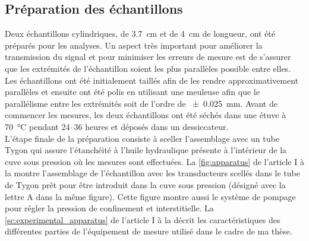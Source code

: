 \subsection{Préparation des échantillons}
Deux échantillons cylindriques, de \SI{3.7}{\cm} et de \SI{4}{\cm} de longueur,
ont été préparés pour les analyses. Un aspect très important pour améliorer la
transmission du signal et pour minimiser les erreurs de mesure est de s'assurer
que les extrémités de l'échantillon soient les plus parallèles possible entre
elles. Les échantillons ont été initialement taillés afin de les rendre
approximativement parallèles et ensuite ont été polis en utilisant une meuleuse
afin que le parallélisme entre les extrémités soit de l'ordre de
\SI{\pm0.025}{\mm}. Avant de commencer les mesures, les deux échantillons ont
été séchés dans une étuve à \SI{70}{\degreeCelsius} pendant \numrange{24}{36}
heures et déposés dans un dessiccateur.\\
L'étape finale de la préparation consiste à sceller l'assemblage avec un tube
Tygon\texttrademark{} qui assure l’étanchéité à l'huile hydraulique présente à
l’intérieur de la cuve sous pression où les mesures sont effectuées. La
\cref{fig:apparatus} de l’article I à la  montre
l'assemblage de l'échantillon avec les transducteurs scellés dans le tube de
Tygon\texttrademark{} prêt pour être introduit dans la cuve sous pression
(désigné avec la lettre A dans la même figure). Cette figure montre aussi le
système de pompage pour régler la pression de confinement et interstitielle. La
\cref{sc:experimental_apparatus} de l'article I à la
 décrit les caractéristiques des différentes
parties de l'équipement de mesure utilisé dans le cadre de ma thèse.
